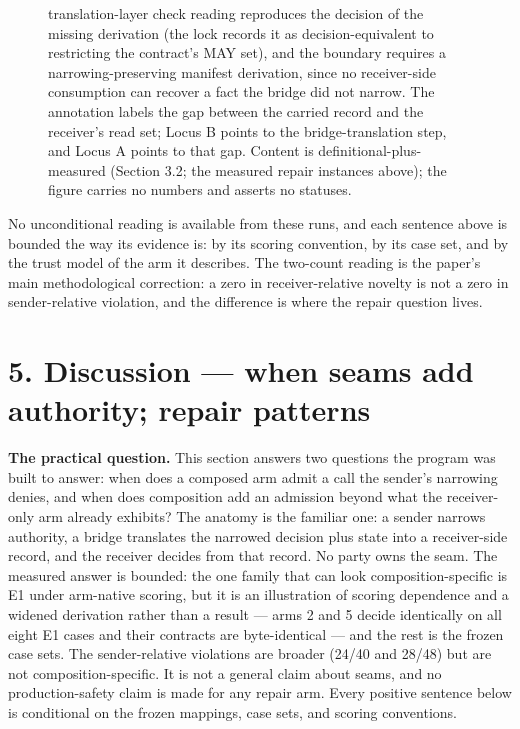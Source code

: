 \documentclass[
  10pt,
]{article}
\let\origtexttt\texttt
\renewcommand{\texttt}[1]{{\upshape\origtexttt{#1}}}
\renewcommand{\_}{\allowbreak\origunderscore}
\begin{document}
\begin{figure}
{translation-layer check reading \protect\texttt{snapshot.actions}
reproduces the decision of the missing derivation (the lock records it
as decision-equivalent to restricting the contract's MAY set), and the
boundary requires a narrowing-preserving manifest derivation, since no
receiver-side consumption can recover a fact the bridge did not narrow.
The annotation \protect\texttt{carried\ but\ unread\ =\ uncarried}
labels the gap between the carried record and the receiver's read set;
Locus B points to the bridge-translation step, and Locus A points to
that gap. Content is definitional-plus-measured (Section 3.2; the
measured repair instances above); the figure carries no numbers and
asserts no statuses.}\label{fig:figure2}
\end{figure}

No unconditional reading is available from these runs, and each sentence
above is bounded the way its evidence is: by its scoring convention, by
its case set, and by the trust model of the arm it describes. The
two-count reading is the paper's main methodological correction: a zero
in receiver-relative novelty is not a zero in sender-relative violation,
and the difference is where the repair question lives.

\section{5. Discussion --- when seams add authority; repair
patterns}\label{discussion-when-seams-add-authority-repair-patterns}

\textbf{The practical question.} This section answers two questions the
program was built to answer: when does a composed arm admit a call the
sender's narrowing denies, and when does composition add an admission
beyond what the receiver-only arm already exhibits? The anatomy is the
familiar one: a sender narrows authority, a bridge translates the
narrowed decision plus state into a receiver-side record, and the
receiver decides from that record. No party owns the seam. The measured
answer is bounded: the one family that can look composition-specific is
E1 under arm-native scoring, but it is an illustration of scoring
dependence and a widened derivation rather than a result --- arms 2 and
5 decide identically on all eight E1 cases and their contracts are
byte-identical --- and the rest is the frozen case sets. The
sender-relative violations are broader (24/40 and 28/48) but are not
composition-specific. It is not a general claim about seams, and no
production-safety claim is made for any repair arm. Every positive
sentence below is conditional on the frozen mappings, case sets, and
scoring conventions.
\end{document}

